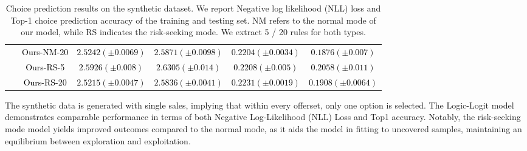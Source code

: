 \documentclass{article} %
\begin{document}
\begin{table}[ht]
\begin{tabular}{c|c|c|c|c|c}
 ~  & \textcolor{black}{Ours-NM-20}  & \textcolor{black}{$2.5242(\pm0.0069)$}
 & \textcolor{black}{$2.5871(\pm0.0098)$}& \textcolor{black}{$0.2204(\pm0.0034)$}  & \textcolor{black}{$0.1876(\pm0.007)$} \\
\cline{2-6}

 ~  & \textcolor{black}{Ours-RS-5}  & \textcolor{black}{$2.5926(\pm0.008)$}
 & \textcolor{black}{$2.6305(\pm0.014)$}& \textcolor{black}{$0.2208(\pm0.005)$}  & \textcolor{black}{$0.2058(\pm0.011)$} \\
 \cline{2-6}
 
 ~  & \textcolor{black}{Ours-RS-20}  & \textcolor{black}{$2.5215(\pm0.0047)$}
 & \textcolor{black}{$2.5836(\pm0.0041)$}& \textcolor{black}{$0.2231(\pm0.0019)$}  & \textcolor{black}{$0.1908(\pm0.0064)$} \\
\bottomrule
\end{tabular}
\caption{Choice prediction results on the synthetic dataset. We report Negative log likelihood (NLL) loss and Top-1 choice prediction accuracy of the training and testing set. NM refers to the normal mode of our model, while RS indicates the risk-seeking mode. We extract 5 / 20 rules for both types.}
\label{tab:syn_results}
\end{table}





The synthetic data is generated with \textcolor{black}{single} sales, implying that within every offerset, \textcolor{black}{only} one option is selected. The Logic-Logit model demonstrates comparable performance in terms of both Negative Log-Likelihood (NLL) Loss and Top1 accuracy. Notably, the risk-seeking mode model yields improved outcomes compared to the normal mode, as it aids the model in fitting to uncovered samples, maintaining an equilibrium between exploration and exploitation.
\end{document}
